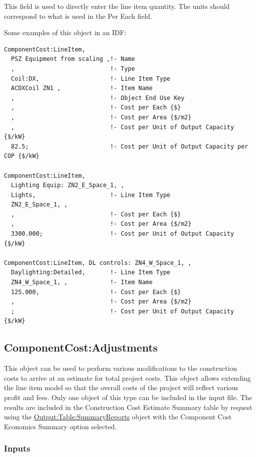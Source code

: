 This field is used to directly enter the line item quantity. The units should correspond to what is used in the Per Each field.

Some examples of this object in an IDF:

\begin{lstlisting}
ComponentCost:LineItem,
  PSZ Equipment from scaling ,!- Name
  ,                           !- Type
  Coil:DX,                    !- Line Item Type
  ACDXCoil ZN1 ,              !- Item Name
  ,                           !- Object End Use Key
  ,                           !- Cost per Each {$}
  ,                           !- Cost per Area {$/m2}
  ,                           !- Cost per Unit of Output Capacity {$/kW}
  82.5;                       !- Cost per Unit of Output Capacity per COP {$/kW}

ComponentCost:LineItem,
  Lighting Equip: ZN2_E_Space_1, ,
  Lights,                     !- Line Item Type
  ZN2_E_Space_1, ,
  ,                           !- Cost per Each {$}
  ,                           !- Cost per Area {$/m2}
  3300.000;                   !- Cost per Unit of Output Capacity {$/kW}

ComponentCost:LineItem, DL controls: ZN4_W_Space_1, ,
  Daylighting:Detailed,       !- Line Item Type
  ZN4_W_Space_1, ,            !- Item Name
  125.000,                    !- Cost per Each {$}
  ,                           !- Cost per Area {$/m2}
  ;                           !- Cost per Unit of Output Capacity {$/kW}
\end{lstlisting}

\subsection{ComponentCost:Adjustments}\label{componentcostadjustments}

This object can be used to perform various modifications to the construction costs to arrive at an estimate for total project costs. This object allows extending the line item model so that the overall costs of the project will reflect various profit and fees. Only one object of this type can be included in the input file. The results are included in the Construction Cost Estimate Summary table by request using the \hyperref[outputtablesummaryreports]{Output:Table:SummaryReports} object with the Component Cost Economics Summary option selected.

\subsubsection{Inputs}

